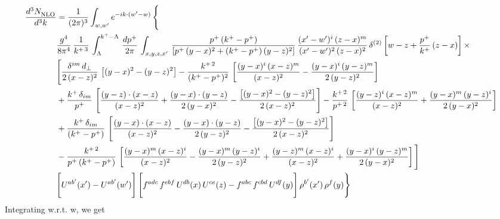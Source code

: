 \documentclass[9pt]{article}
\numberwithin{equation}{section}
\begin{document}
\begin{align}
    \frac{d^{3}N_{\rm NLO}^{\rm}}{d^{3}k}  & =  \frac{1}{(2\pi)^{3}}  \int_{w, w^\prime} e^{-ik\cdot(w^\prime-w)}\, \Bigg\{\notag \\ & \frac{g^{4}}{8\pi^{4}}\,\frac{1}{k^{+\,3}}\,\int_{\Lambda}^{k^{+}-\Lambda}\, \frac{dp^{+}}{2\pi} \, \int_{x,y,z,x'}\,\frac{p^{+}\,(k^{+}-p^{+})}{\left[p^{+}\,(y-x)^{2}+(k^{+}-p^{+})\,(y-z)^{2}\right]}\, \frac{(x'-w')^{i}\,(z-x)^{m}}{(x'-w')^{2}\,(z-x)^{2}}\,\delta^{(2)}\left[w-z+\frac{p^{+}}{k^{+}}\,(z-x)\right]\times \notag \\ & \Bigg[\frac{\delta^{im}\,d_{\perp}}{2\,(x-z)^{2}}\,\left[(y-x)^{2}-(y-z)^{2}\right]-\frac{k^{+\,2}}{(k^{+}-p^{+})^{2}}\,\left[\frac{(y-x)^{i}\,(x-z)^{m}}{(x-z)^{2}}-\frac{(y-x)^{i}\,(y-z)^{m}}{2\,(y-z)^{2}}\right]\notag \\ & +\frac{k^{+}\,\delta_{im}}{p^{+}}\,\left[\frac{(y-z)\cdot (x-z)}{(x-z)^{2}}+\frac{(y-x)\cdot (y-z)}{2\,(y-x)^{2}}-\frac{\left[(y-x)^{2}-(y-z)^{2}\right]}{2\,(x-z)^{2}}\right]-\frac{k^{+\,2}}{p^{+\,2}}\,\left[\frac{(y-z)^{i}\,(x-z)^{m}}{(x-z)^{2}}+\frac{(y-x)^{m}\,(y-z)^{i}}{2\,(y-x)^{2}}\right]\notag \\ & +\frac{k^{+}\,\delta_{im}}{(k^{+}-p^{+})}\,\left[\frac{(y-x)\cdot (x-z)}{(x-z)^{2}}-\frac{(y-x)\cdot (y-z)}{2\,(y-z)^{2}}-\frac{\left[(y-x)^{2}-(y-z)^{2}\right]}{2\,(x-z)^{2}}\right]\notag \\ &-\frac{k^{+\,2}}{p^{+}\, (k^{+}-p^{+})}\,\left[\frac{(y-x)^{m}\,(x-z)^{i}}{(x-z)^{2}}-\frac{(y-x)^{m}\,(y-z)^{i}}{2\,(y-z)^{2}}+\frac{(y-z)^{m}\,(x-z)^{i}}{(x-z)^{2}}+\frac{(y-x)^{i}\,(y-z)^{m}}{2\,(y-x)^{2}}\right]\Bigg] \notag \\ & \Bigg[U^{ab'}(x')-U^{ab'}(w')\Bigg]\,\Bigg[f^{adc}\,f^{ebf}\,U^{db}(x)\,U^{ce}(z)-f^{abc}\,f^{cbd}\,U^{df}(y)\Bigg]\,\rho^{b'}(x')\,\rho^{f}(y)\Bigg\}
\end{align}
Integrating w.r.t. w, we get
\end{document}
